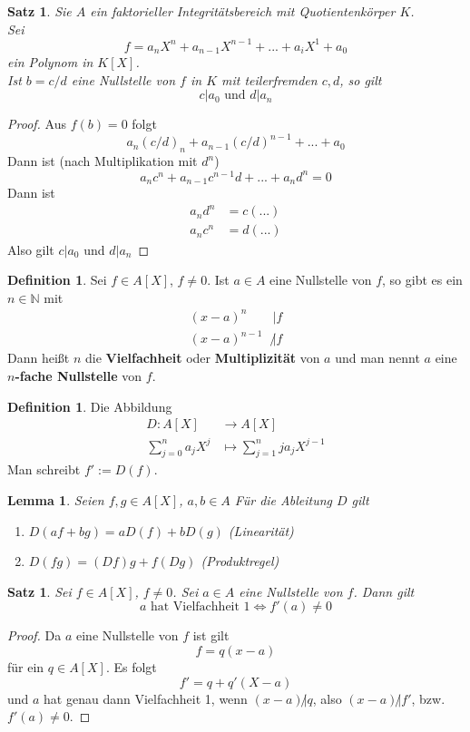 \documentclass[10pt,a4paper]{article}
\newcommand{\N}{\ensuremath{\mathbb{N}}}
\theoremstyle{plain}
\newtheorem{lem}[theorem]{Lemma}
\newtheorem{satz}[theorem]{Satz}
\theoremstyle{definition}
\newtheorem{definition}[theorem]{Definition}
\theoremstyle{remark}
\begin{document}
	\begin{satz}
		Sie $A$ ein faktorieller Integritätsbereich mit Quotientenkörper $K$.\\
		Sei
		\[f=a_nX^n+a_{n-1}X^{n-1}+...+a_iX^1+a_0\]
		ein Polynom in $K[X]$.\\
		Ist $b=c/d$ eine Nullstelle von $f$ in $K$ mit teilerfremden $c,d$, so gilt
		\[\text{$c|a_0$ und $d|a_n$}\]
	\end{satz}
	\begin{proof}
		Aus $f(b)=0$ folgt\[a_n\left(c/d\right)_{n}+a_{n-1}(c/d)^{n-1}+...+a_0\]
		Dann ist (nach Multiplikation mit $d^n$)
		\[a_nc^n+a_{n-1}c^{n-1}d+...+a_nd^n=0\]
		Dann ist
		\begin{align*}
		a_nd^n&=c(...)\\
		a_nc^n&=d(...)
		\end{align*}
		Also gilt $c|a_0$ und $d|a_n$
	\end{proof}

	\begin{definition}
		Sei $f\in A[X]$, $f\neq 0$. Ist $a\in A$ eine Nullstelle von $f$, so gibt es ein $n\in\N$ mit
		\begin{align*}
		(x-a)^n&|f\\
		(x-a)^{n-1}&\not |f
		\end{align*} 
		Dann heißt $n$ die \textbf{Vielfachheit} oder \textbf{Multiplizität} von $a$ und man nennt $a$ eine \textbf{$n$-fache Nullstelle} von $f$.
	\end{definition}

	\begin{definition}
		Die Abbildung
		\begin{align*}
		D: A[X]&\to A[X]\\
		\sum_{j=0}^{n}a_jX^j&\mapsto\sum_{j=1}^n ja_jX^{j-1}
		\end{align*}
		Man schreibt $f':=D(f)$.
	\end{definition}
	\begin{lem}
		Seien $f,g\in A[X]$, $a,b\in A$
		Für die Ableitung $D$ gilt
		\begin{enumerate}
			\item $D(af+bg)=aD(f)+bD(g)$ (Linearität)
			\item $D(fg)=(Df)g+f(Dg)$ (Produktregel)
		\end{enumerate}
	\end{lem}

	\begin{satz}
		Sei $f\in A[X]$, $f\neq 0$. Sei $a\in A$ eine Nullstelle von $f$. Dann gilt
		\[\text{$a$ hat Vielfachheit $1$}\Leftrightarrow f'(a)\neq 0\]
	\end{satz}
	\begin{proof}
		Da $a$ eine Nullstelle von $f$ ist gilt
		\[f=q(x-a)\]
		für ein $q\in A[X]$. Es folgt
		\[f'=q+q'(X-a)\]
		und $a$ hat genau dann Vielfachheit 1, wenn $(x-a)\not| q$, also $(x-a)\not | f'$, bzw. $f'(a)\neq 0$.
	\end{proof}
\end{document}

